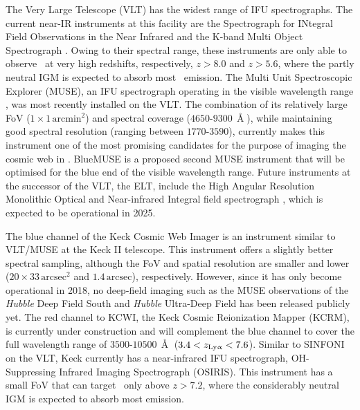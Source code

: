 The Very Large Telescope (VLT) has the widest range of IFU spectrographs. The current near-IR instruments at this facility are the Spectrograph for INtegral Field Observations in the Near Infrared \citep[SINFONI, see][]{2003SPIE.4841.1548E, 2004Msngr.117...17B} and the K-band Multi Object Spectrograph \citep[KMOS, see][]{2013Msngr.151...21S}. Owing to their spectral range, these instruments are only able to observe \lya\ at very high redshifts, respectively, $z > 8.0$ and $z > 5.6$, where the partly neutral IGM is expected to absorb most \lya\ emission. The Multi Unit Spectroscopic Explorer (MUSE), an IFU spectrograph operating in the visible wavelength range \citep[see][]{2010SPIE.7735E..08B}, was most recently installed on the VLT. The combination of its relatively large FoV ($1 \times 1 \, \mathrm{arcmin}^2$) and spectral coverage ($4650$-$9300 \, \Angstrom$), while maintaining good spectral resolution (ranging between $1770$-$3590$), currently makes this instrument one of the most promising candidates for the purpose of imaging the cosmic web in \lya. BlueMUSE \citep{2019arXiv190601657R} is a proposed second MUSE instrument that will be optimised for the blue end of the visible wavelength range. Future instruments at the successor of the VLT, the ELT, include the High Angular Resolution Monolithic Optical and Near-infrared Integral field spectrograph \citep[HARMONI, see][]{2014SPIE.9147E..25T}, which is expected to be operational in 2025.

The blue channel of the Keck Cosmic Web Imager \citep[KCWI, see][]{2018ApJ...864...93M} is an instrument similar to VLT/MUSE at the Keck II telescope. This instrument offers a slightly better spectral sampling, although the FoV and spatial resolution are smaller and lower ($20 \times 33 \, \mathrm{arcsec}^2$ and $1.4 \, \mathrm{arcsec}$), respectively. However, since it has only become operational in 2018, no deep-field imaging such as the MUSE observations of the \textit{Hubble} Deep Field South and \textit{Hubble} Ultra-Deep Field \citep{2015A&A...575A..75B, 2017A&A...608A...1B} has been released publicly yet. The red channel to KCWI, the Keck Cosmic Reionization Mapper (KCRM), is currently under construction and will complement the blue channel to cover the full wavelength range of $3500$-$10500 \, \Angstrom$ ($3.4<z_\text{{Ly\ensuremath{\upalpha}}}<7.6$). Similar to SINFONI on the VLT, Keck currently has a near-infrared IFU spectrograph, OH-Suppressing Infrared Imaging Spectrograph (OSIRIS). This instrument has a small FoV that can target \lya\ only above $z>7.2$, where the considerably neutral IGM is expected to absorb most emission.

